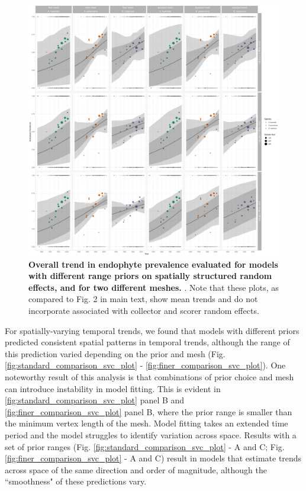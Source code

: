 \documentclass[11pt]{article}
\newcommand{\revise}[1]{{\color{black}{#1}}}
\begin{document}
\begin{figure}[H]
	\centering
	\includegraphics[width = \linewidth]{../Plots/prior_comparison_year_plot.png}
	\caption[Overall trend in endophyte prevalence evaluated for endophyte prevalence models with different range priors on spatially structured random effects, and for two different meshes]{\textbf{Overall trend in endophyte prevalence evaluated for \revise{endophyte prevalence} models with different range priors on spatially structured random effects, and for two different \revise{triangulation} meshes.} \revise{Data used in model fitting is the same across all panels and as in the main text}. Note that these plots, as compared to Fig. 2 in main text, show mean trends and do not incorporate \revise{variance} associated with collector and scorer random effects.}
	\label{fig:prior_year_plot}
\end{figure}

For spatially-varying temporal trends, we found that models with different priors predicted consistent spatial patterns in temporal trends, although the range of this prediction varied depending on the prior and mesh (Fig. \ref{fig:standard_comparison_svc_plot} - \ref{fig:finer_comparison_svc_plot}). 
One noteworthy result of this analysis is that combinations of prior choice and mesh can introduce instability in model fitting. This is evident in \ref{fig:standard_comparison_svc_plot} panel B and \ref{fig:finer_comparison_svc_plot} panel B, where the prior range is smaller than the minimum vertex length of the mesh.
Model fitting takes an extended time period and the model struggles to identify variation across space. Results with a set of prior ranges (Fig. \ref{fig:standard_comparison_svc_plot} -  A and C; Fig. \ref{fig:finer_comparison_svc_plot} - A and C) result in models that estimate trends across space of the same direction and order of magnitude, although the ``smoothness" of these predictions vary.
\end{document}
